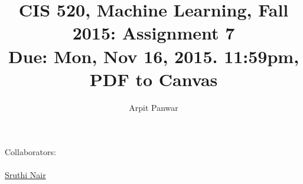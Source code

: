 \documentclass[english]{article}
\title{CIS 520, Machine Learning, Fall 2015: Assignment 7\\
Due: Mon,  Nov 16, 2015. 11:59pm, PDF to Canvas\\
\hpoints{100}}
\date{}
\author{Arpit Panwar}
\begin{document}
\maketitle
{\normalsize Collaborators: \\ 
\\ \underline{ Sruthi Nair  }}

\end{document}
